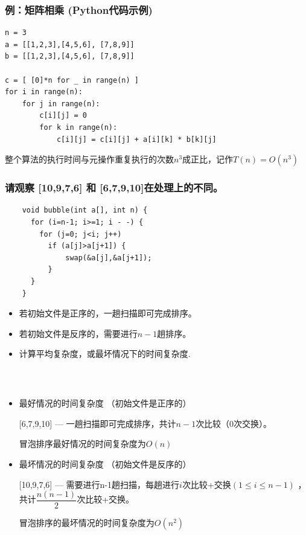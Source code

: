 \begin{frame}[fragile]
  \frametitle{例：矩阵相乘 (Python代码示例)}
  \begin{verbatim}
n = 3
a = [[1,2,3],[4,5,6], [7,8,9]]
b = [[1,2,3],[4,5,6], [7,8,9]]

c = [ [0]*n for _ in range(n) ]
for i in range(n):
    for j in range(n):
        c[i][j] = 0
        for k in range(n):
            c[i][j] = c[i][j] + a[i][k] * b[k][j]
  \end{verbatim}

  \begin{tcolorbox}
    整个算法的执行时间与元操作重复执行的次数$n^3$成正比，记作$T(n) = O(n^3)$
  \end{tcolorbox}
\end{frame}

\begin{frame}[fragile]
  \frametitle{请观察 [10,9,7,6] 和 [6,7,9,10]在处理上的不同。}
  \begin{verbatim}
    void bubble(int a[], int n) {
      for (i=n-1; i>=1; i - -) {
        for (j=0; j<i; j++)
          if (a[j]>a[j+1]) {
              swap(&a[j],&a[j+1]);
          }
      }
    }
  \end{verbatim}

  \pause

  \begin{itemize}
  \item 若初始文件是正序的，一趟扫描即可完成排序。
  \item 若初始文件是反序的，需要进行$n-1$趟排序。
  \item \color{red}计算平均复杂度，或最坏情况下的时间复杂度.
  \end{itemize}
\end{frame}

\begin{frame}[fragile]
  \frametitle{~}
  \begin{itemize}
    \item 最好情况的时间复杂度 （初始文件是正序的）

      [6,7,9,10] --- 一趟扫描即可完成排序，共计$n-1$次比较（0次交换）。

      冒泡排序最好情况的时间复杂度为$O(n)$

   \item 最坏情况的时间复杂度 （初始文件是反序的）

     [10,9,7,6] --- 需要进行n-1趟扫描，每趟进行$i$次比较+交换$(1\leq i \leq n-1)$ ，共计$\dfrac{n (n-1)}{2}$次比较+交换。

     冒泡排序的最坏情况的时间复杂度为$O(n^2)$

  \end{itemize}
\end{frame}


